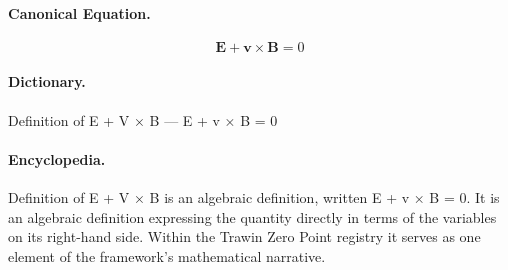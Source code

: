 \paragraph{Canonical Equation.}
\[
\mathbf{E} + \mathbf{v} \times \mathbf{B} = 0
\]

\paragraph{Dictionary.}
Definition of E + V × B — E + v × B = 0

\paragraph{Encyclopedia.}
Definition of E + V × B is an algebraic definition, written E + v × B = 0. It is an algebraic definition expressing the quantity directly in terms of the variables on its right-hand side. Within the Trawin Zero Point registry it serves as one element of the framework's mathematical narrative.
